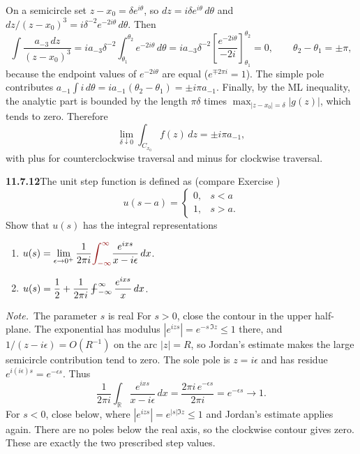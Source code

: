 On a semicircle set $z-x_0=\delta e^{i\theta}$, so
$dz=i\delta e^{i\theta}\,d\theta$ and $dz/(z-x_0)^3
=i\delta^{-2}e^{-2i\theta}\,d\theta$. Then
\[
\int \frac{a_{-3}\,dz}{(z-x_0)^3}
=ia_{-3}\delta^{-2}\int_{\theta_1}^{\theta_2}e^{-2i\theta}\,d\theta
=ia_{-3}\delta^{-2}\left[\frac{e^{-2i\theta}}{-2i}\right]_{\theta_1}^{\theta_2}=0,
\qquad \theta_2-\theta_1=\pm\pi,
\]
because the endpoint values of $e^{-2i\theta}$ are equal
($e^{\mp2\pi i}=1$). The simple pole contributes
$a_{-1}\int i\,d\theta=ia_{-1}(\theta_2-\theta_1)=\pm i\pi a_{-1}$.
Finally, by the ML inequality, the analytic part is bounded by the
length $\pi\delta$ times $\max_{|z-x_0|=\delta}|g(z)|$, which tends to
zero. Therefore
\[
\boxed{\lim_{\delta\downarrow0}\int_{C_{x_0}}f(z)\,dz
=\pm i\pi a_{-1}},
\]
with plus for counterclockwise traversal and minus for clockwise traversal.

\par\bigskip
\noindent\textbf{11.7.12}\quad The unit step function is defined as (compare
Exercise )
\[
u(s-a)=\begin{cases}
0, & s<a\\
1, & s>a.
\end{cases}
\]
Show that $u(s)$ has the integral representations
\begin{enumerate}
\item[(a)] $u(s)=\displaystyle\lim_{\epsilon\to0^{+}}\frac{1}{2\pi i}
  \erratum{\displaystyle\int_{-\infty}^{\infty}}\frac{e^{ixs}}{x-i\epsilon}\,dx$.
\item[(b)] $u(s)=\dfrac{1}{2}+\dfrac{1}{2\pi i}\displaystyle
  \PVint_{-\infty}^{\infty}\frac{e^{ixs}}{x}\,dx$.
\end{enumerate}
\emph{Note.}~The parameter $s$ is real 
\solution
{}
For $s>0$, close the contour in the upper half-plane. The exponential
has modulus $|e^{izs}|=e^{-s\,\Im z}\le1$ there, and
$1/(z-i\epsilon)=O(R^{-1})$ on the arc $|z|=R$, so Jordan's estimate
makes the large semicircle contribution tend to zero. The sole pole is
$z=i\epsilon$ and has residue $e^{i(i\epsilon)s}=e^{-\epsilon s}$. Thus
\[
\frac1{2\pi i}\int_{\mathbb R}\frac{e^{ixs}}{x-i\epsilon}\,dx
=\frac{2\pi i\,e^{-\epsilon s}}{2\pi i}
=e^{-\epsilon s}\longrightarrow1.
\]
For $s<0$, close below, where $|e^{izs}|=e^{|s|\Im z}\le1$ and Jordan's
estimate applies again. There are no poles below the real axis, so the
clockwise contour gives zero. These are exactly the two prescribed step
values.

